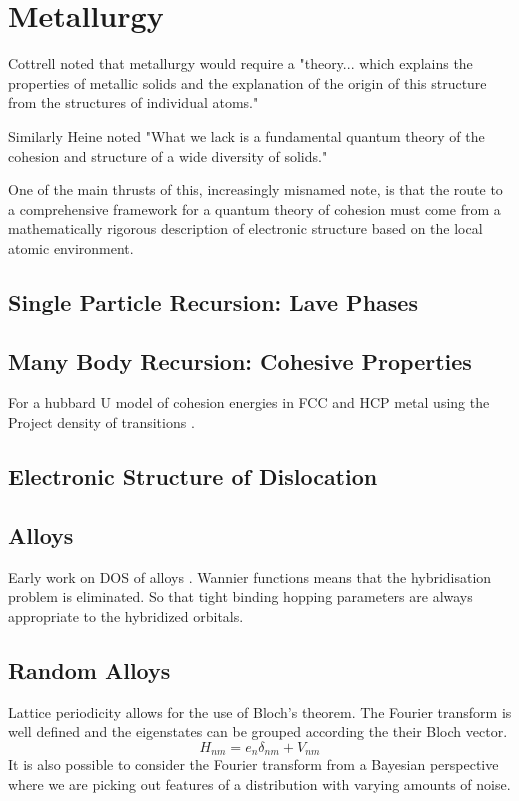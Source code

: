 \chapter{Metallurgy}
  Cottrell noted that metallurgy would require a "theory... which explains
the properties of metallic solids and the explanation of the origin of this
structure from the structures of individual atoms." 

Similarly Heine noted "What we lack is a fundamental quantum 
theory of the cohesion and structure of a wide diversity of solids." 

One of the main thrusts of this, increasingly misnamed note, is that the route
to a comprehensive framework for a quantum theory of cohesion must come
from a mathematically rigorous description of electronic structure based
on the local atomic environment. 

\section{Single Particle Recursion: Lave Phases}

\section{Many Body Recursion: Cohesive Properties}
For a hubbard U model of cohesion energies in FCC and HCP metal using the Project density of transitions
\cite{haydock14}.

\section{Electronic Structure of Dislocation}
\cite{paidar81}

\section{Alloys}
Early work on DOS of alloys \cite{cubiotti77}. 
Wannier functions means that the hybridisation problem is eliminated. 
So that tight binding hopping parameters are always appropriate to the
hybridized orbitals.

\section{Random Alloys}
Lattice periodicity allows for the use of Bloch's theorem. The Fourier transform
is well defined and the eigenstates can be grouped according the their Bloch vector.
%
\begin{equation}
H_{nm} = e_{n}\delta_{nm} + V_{nm}
\end{equation}
%
It is also possible to consider the Fourier transform from a Bayesian perspective
where we are picking out features of a distribution with varying amounts of noise.

